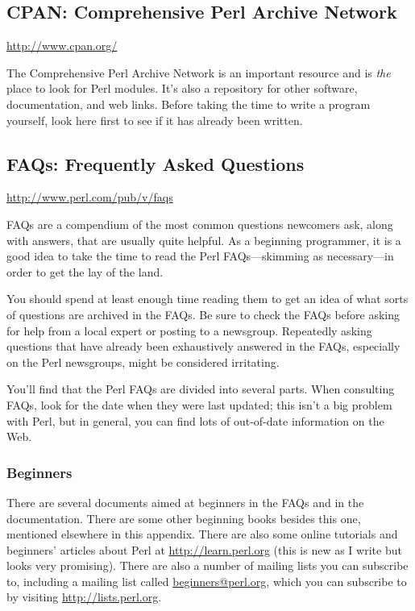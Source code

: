 \subsection{CPAN: Comprehensive Perl Archive Network}
\href{http://www.cpan.org/}{http://www.cpan.org/}

\begin{adjustwidth}{2em}{}
The Comprehensive Perl Archive Network is an important resource and is \textit{the} place to look for Perl modules. It's also a repository for other software, documentation, and web links. Before taking the time to write a program yourself, look here first to see if it has already been written.
\end{adjustwidth}

\subsection{FAQs: Frequently Asked Questions}
\href{http://www.perl.com/pub/v/faqs}{http://www.perl.com/pub/v/faqs}

\begin{adjustwidth}{2em}{}
FAQs are a compendium of the most common questions newcomers ask, along with answers, that are usually quite helpful. As a beginning programmer, it is a good idea to take the time to read the Perl FAQs—skimming as necessary—in order to get the lay of the land.
\end{adjustwidth}

You should spend at least enough time reading them to get an idea of what sorts of questions are archived in the FAQs. Be sure to check the FAQs before asking for help from a local expert or posting to a newsgroup. Repeatedly asking questions that have already been exhaustively answered in the FAQs, especially on the Perl newsgroups, might be considered irritating.

You'll find that the Perl FAQs are divided into several parts. When consulting FAQs, look for the date when they were last updated; this isn't a big problem with Perl, but in general, you can find lots of out-of-date information on the Web.

\subsubsection{Beginners}
There are several documents aimed at beginners in the FAQs and in the documentation. There are some other beginning books besides this one, mentioned elsewhere in this appendix. There are also some online tutorials and beginners' articles about Perl at \href{http://learn.perl.org}{http://learn.perl.org} (this is new as I write but looks very promising). There are also a number of mailing lists you can subscribe to, including a mailing list called \href{mailto:beginners@perl.org}{beginners@perl.org}, which you can subscribe to by visiting \href{http://lists.perl.org}{http://lists.perl.org}.

